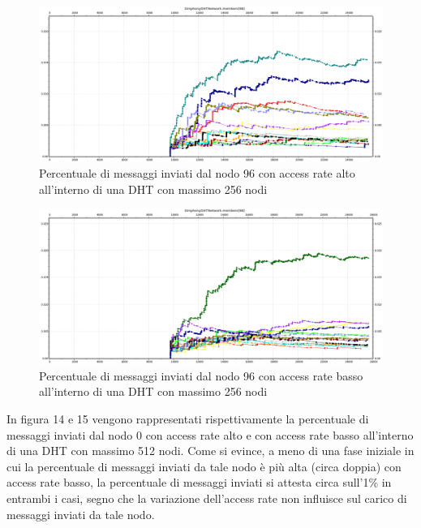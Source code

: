 \documentclass[	
	DIV=calc,
	paper=a4,
	fontsize=11pt,
	onecolumn
]{scrartcl} %
\begin{document}
	\begin{figure}[H]
		\centering
		\includegraphics[scale=0.35]	{SymphonyDHT/plots/PercentageOfMessagesSent/256_Nodes_FastAccess/SymphonyDHT_256Nodes_FastAccess_Node96.png}
		\caption{Percentuale di messaggi inviati dal nodo 96 con access rate alto all'interno di una DHT con massimo 256 nodi}
		\label{Figura 12}
	\end{figure}
	\begin{figure}[H]
		\centering
		\includegraphics[scale=0.35]	{SymphonyDHT/plots/PercentageOfMessagesSent/256_Nodes_SlowAccess/SymphonyDHT_256Nodes_SlowAccess_Node96.png}
		\caption{Percentuale di messaggi inviati dal nodo 96 con access rate basso all'interno di una DHT con massimo 256 nodi}
		\label{Figura 13}
	\end{figure}	
	
	In figura 14 e 15 vengono rappresentati rispettivamente la percentuale di messaggi inviati dal nodo 0 con access rate alto e con access rate basso all'interno di una DHT con massimo 512 nodi. Come si evince, a meno di una fase iniziale in cui la percentuale di messaggi inviati da tale nodo è più alta (circa doppia) con access rate basso, la percentuale di messaggi inviati si attesta circa sull'1\% in entrambi i casi, segno che la variazione dell'access rate non influisce sul carico di messaggi inviati da tale nodo.  
	
\end{document}

